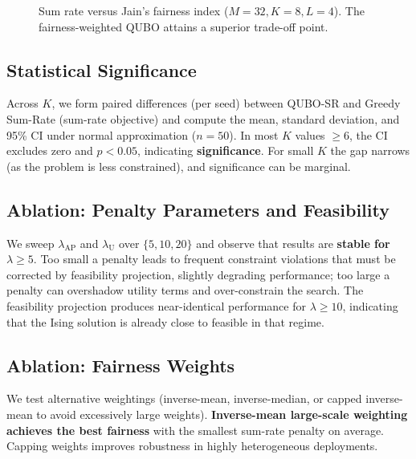 \begin{figure}[htbp]
\centering
{}
\caption{Sum rate versus Jain's fairness index ($M=32, K=8, L=4$). The fairness-weighted QUBO attains a superior trade-off point.}
\label{fig:tradeoff}
\end{figure}

\subsection{Statistical Significance}
Across $K$, we form paired differences (per seed) between QUBO-SR and Greedy Sum-Rate (sum-rate objective) and compute the mean, standard deviation, and 95\% CI under normal approximation ($n=50$). In most $K$ values $\ge 6$, the CI excludes zero and $p<0.05$, indicating \textbf{significance}. For small $K$ the gap narrows (as the problem is less constrained), and significance can be marginal.

\subsection{Ablation: Penalty Parameters and Feasibility}
We sweep $\lambda_{\text{AP}}$ and $\lambda_{\text{U}}$ over $\{5,10,20\}$ and observe that results are \textbf{stable for $\lambda\ge 5$}. Too small a penalty leads to frequent constraint violations that must be corrected by feasibility projection, slightly degrading performance; too large a penalty can overshadow utility terms and over-constrain the search. The feasibility projection produces near-identical performance for $\lambda\ge 10$, indicating that the Ising solution is already close to feasible in that regime.

\subsection{Ablation: Fairness Weights}
We test alternative weightings (inverse-mean, inverse-median, or capped inverse-mean to avoid excessively large weights). \textbf{Inverse-mean large-scale weighting achieves the best fairness} with the smallest sum-rate penalty on average. Capping weights improves robustness in highly heterogeneous deployments.

